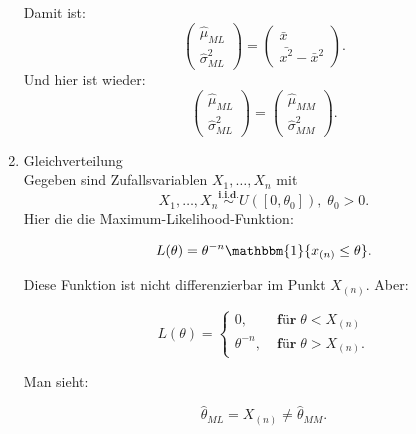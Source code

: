 \documentclass[10pt]{article}
\newcommand{\FZV}{X_1, \ldots, X_n} %
\newenvironment{BSP}[1][]
{\begin{Beispiel}[frametitle=#1]}{\end{Beispiel}}
\begin{document}
\begin{BSP}[Maximum-Likelihood]
\begin{enumerate}[label = (\roman*)]
			Damit ist:
			\begin{equation*}
				\left(
				\begin{array}{c}
					\hat{\mu}_{ML}\\
					\hat{\sigma}^2_{ML}
				\end{array}\right)
				=
				\left(
				\begin{array}{c}
					\bar{x}\\
					\bar{x^2}-\bar{x}^2
				\end{array}
				\right).
			\end{equation*}
			Und hier ist wieder:
			\begin{equation*}
				\left(
				\begin{array}{c}
					\hat{\mu}_{ML}\\
					\hat{\sigma}^2_{ML}
				\end{array}\right)
				=
				\left(
				\begin{array}{c}
					\hat{\mu}_{MM}\\
					\hat{\sigma}^2_{MM}
				\end{array}
				\right).
			\end{equation*}
			
			
			\item Gleichverteilung\\
			Gegeben sind Zufallsvariablen $\FZV$ mit
			\begin{equation*}
				\FZV \overset{\textbf{i.i.d.}}{\sim} U([0,\theta_0]), \; \theta_0 >0.
			\end{equation*}
			Hier die die Maximum-Likelihood-Funktion:
			
			\begin{equation*}
				L(\theta)=\theta^{-n}\mathbbm{1} \{x_{(n)}\leq  \theta \}.
			\end{equation*}
			
			Diese Funktion ist nicht differenzierbar im Punkt $X_{(n)}$. Aber:
			
			\begin{equation*}
				L(\theta) =
				\begin{cases}
					0, \;&\textbf{für}\; \theta < X_{(n)}\\
					\theta^{-n}, \; &\textbf{für} \; \theta > X_{(n)}.
				\end{cases}
			\end{equation*}
			
			Man sieht:
			
			\begin{equation*}
				\hat{\theta}_{ML} = X_{(n)} \neq \hat{\theta}_{MM}.
			\end{equation*}
		\end{enumerate}
		
	\end{BSP}
	
\end{document}
